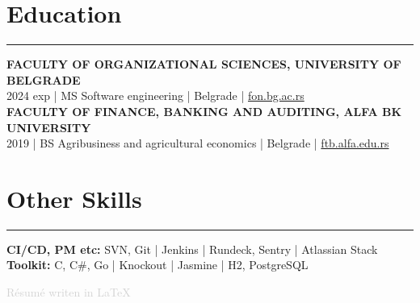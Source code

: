 \documentclass[a4paper, 11pt]{article}
\begin{document}
\section*{Education}
\vspace{-0.3cm}
\hrule
\vspace{0.3cm}
{\fontsize{12pt}{16pt}\selectfont \textbf{FACULTY OF ORGANIZATIONAL SCIENCES, UNIVERSITY OF BELGRADE}} \\
2024 exp | MS Software engineering | Belgrade | \href{http://fon.bg.ac.rs}{fon.bg.ac.rs} \\
{\fontsize{12pt}{16pt}\selectfont \textbf{FACULTY OF FINANCE, BANKING AND AUDITING, ALFA BK UNIVERSITY}} \\
2019 | BS Agribusiness and agricultural economics | Belgrade | \href{http://ftb.alfa.edu.rs}{ftb.alfa.edu.rs}
\vspace{-0.4cm}
\section*{Other Skills}
\vspace{-0.3cm}
\hrule
\vspace{0.3cm}
\textbf{CI/CD, PM etc:} SVN, Git | Jenkins | Rundeck, Sentry | Atlassian Stack \\
\textbf{Toolkit:} C, C\#, Go | Knockout | Jasmine | H2, PostgreSQL
\begin{flushright}\textcolor{lightgray}{Résumé writen in \LaTeX} \end{flushright}
\end{document}

